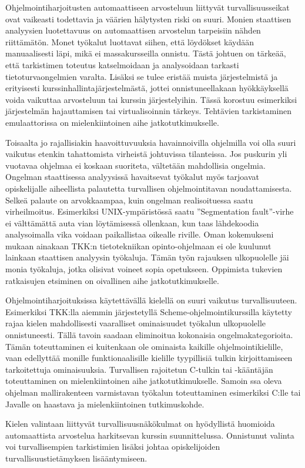 Ohjelmointiharjoitusten automaattiseen arvosteluun liittyvät turvallisuusseikat
ovat vaikeasti todettavia ja väärien hälytysten riski on suuri. Monien
staattisen analyysien luotettavuus on automaattisen arvostelun tarpeisiin
nähden riittämätön. Monet työkalut luottavat siihen, että löydökset käydään
manuaalisesti läpi, mikä ei massakursseilla onnistu. Tästä johtuen on tärkeää,
että tarkistimen toteutus katselmoidaan ja analysoidaan tarkasti
tietoturvaongelmien varalta. Lisäksi se tulee eristää muista järjestelmistä ja
erityisesti kurssinhallintajärjestelmästä, jottei onnistuneellakaan
hyökkäyksellä voida vaikuttaa arvosteluun tai kurssin järjestelyihin. Tässä
korostuu esimerkiksi järjestelmän hajauttamisen tai virtualisoinnin tärkeys.
Tehtävien tarkistaminen emulaattorissa on mielenkiintoinen aihe
jatkotutkimukselle.

Toisaalta jo rajallisiakin haavoittuvuuksia havainnoivilla ohjelmilla voi olla
suuri vaikutus etenkin tahattomista virheistä johtuvissa tilanteissa. Jos
puskurin yli vuotavaa ohjelmaa ei koskaan suoriteta, vältetään
mahdollisia ongelmia. Ongelman staattisessa analyysissä havaitsevat työkalut
myös tarjoavat opiskelijalle aiheellista palautetta turvallisen ohjelmointitavan
noudattamisesta. Selkeä palaute on arvokkaampaa, kuin ongelman realisoituessa
saatu virheilmoitus. Esimerkiksi UNIX-ympäristössä saatu
''Segmentation fault''-virhe ei välttämättä auta vian löytämisessä ollenkaan, kun
taas lähdekoodia analysoimalla vika voidaan paikallistaa oikealle riville. Oman
kokemukseni mukaan ainakaan TKK:n tietotekniikan opinto-ohjelmaan ei ole
kuulunut lainkaan staattisen analyysin työkaluja. Tämän työn rajauksen
ulkopuolelle jäi monia työkaluja, jotka olisivat voineet sopia opetukseen.
Oppimista tukevien ratkaisujen etsiminen on oivallinen aihe jatkotutkimukselle.

Ohjelmointiharjoituksissa käytettävällä kielellä on suuri vaikutus
turvallisuuteen. Esimerkiksi TKK:lla aiemmin järjestetyllä Scheme-ohjelmointikurssilla
käytetty {\scmrobo} rajaa kielen mahdollisesti vaaralliset ominaisuudet
työkalun ulkopuolelle onnistuneesti. Tällä tavoin saadaan eliminoitua
kokonaisia ongelmakategorioita. Tämän toteuttaminen ei kuitenkaan
ole ominaista kaikille ohjelmointikielille, vaan edellyttää monille
funktionaalisille kielille tyypillisiä tulkin kirjoittamiseen tarkoitettuja
ominaisuuksia. Turvallisen rajoitetun C-tulkin tai -kääntäjän toteuttaminen
on mielenkiintoinen aihe jatkotutkimukselle. Samoin \scmrobo ssa oleva
ohjelman mallirakenteen varmistavan työkalun toteuttaminen esimerkiksi C:lle
tai Javalle on haastava ja mielenkiintoinen tutkimuskohde.

Kielen valintaan liittyvät turvallisuusnäkökulmat on hyödyllistä
huomioida automaattista arvostelua harkitsevan kurssin suunnittelussa.
Onnistunut valinta voi turvallisempien tarkistimien lisäksi johtaa
opiskelijoiden turvallisuustietämyksen lisääntymiseen.

\pagebreak


